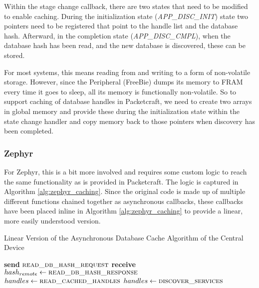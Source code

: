 Within the stage change callback, there are two states that need to be modified to enable caching. During the initialization state (\textit{APP\_DISC\_INIT}) state two pointers need to be registered that point to the handle list and the database hash. Afterward, in the completion state (\textit{APP\_DISC\_CMPL}), when the database hash has been read, and the new database is discovered, these can be stored.

For most systems, this means reading from and writing to a form of non-volatile storage. However, since the Peripheral (FreeBie) dumps its memory to FRAM every time it goes to sleep, all its memory is functionally non-volatile. So to support caching of database handles in Packetcraft, we need to create two arrays in global memory and provide these during the initialization state within the state change handler and copy memory back to those pointers when discovery has been completed.

\subsubsection{Zephyr}
For Zephyr, this is a bit more involved and requires some custom logic to reach the same functionality as is provided in Packetcraft. The logic is captured in Algorithm \ref{alg:zephyr_caching}. Since the original code is made up of multiple different functions chained together as asynchronous callbacks, these callbacks have been placed inline in Algorithm \ref{alg:zephyr_caching} to provide a linear, more easily understood version.

\begin{algorithm}
    \caption{Linear Version of the Asynchronous Database Cache Algorithm of the Central Device}
    \label{alg:zephyr_caching}
    \begin{algorithmic}[1] 
            \State \textbf{send} $\Call{read\_db\_hash\_request}{}$
            \State \textbf{receive} $hash_{remote} \gets \Call{read\_db\_hash\_response}{}$
                    \State $handles \gets \Call{read\_cached\_handles}{}$
                    \State {}
                    \State \Return
                \EndIf
            \EndIf
            \State $handles \gets\Call{discover\_services}{}$
            \State {}
            \State {}
        \EndProcedure
    \end{algorithmic}
\end{algorithm}

